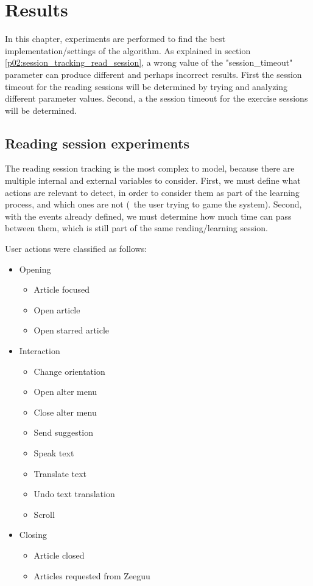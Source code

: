 \chapter{Results}\label{p03:results}
In this chapter, experiments are performed to find the best implementation/settings of the algorithm. As explained in section \ref{p02:session_tracking_read_session}, a wrong value of the "session\_timeout" parameter can produce different and perhaps incorrect results.
First the session timeout for the reading sessions will be determined by trying and analyzing different parameter values. Second, a the session timeout for the exercise sessions will be determined.

\section{Reading session experiments}
The reading session tracking is the most complex to model, because there are multiple internal and external variables to consider. First, we must define what actions are relevant to detect, in order to consider them as part of the learning process, and which ones are not (\Ie\ the user trying to game the system). Second, with the events already defined, we must determine how much time can pass between them, which is still part of the same reading/learning session.

User actions were classified as follows:
\begin{itemize}
	\item Opening
		\begin{itemize}
			\item Article focused
			\item Open article
			\item Open starred article
		\end{itemize}
	
	\item Interaction
		\begin{itemize}
			\item Change orientation
			\item Open alter menu
			\item Close alter menu
			\item Send suggestion
			\item Speak text
			\item Translate text
			\item Undo text translation
			\item Scroll
		\end{itemize}
	
	\item Closing
		\begin{itemize}
			\item Article closed
			\item Articles requested from Zeeguu
		\end{itemize}
\end{itemize}


